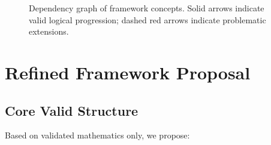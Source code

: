 \begin{figure}[H]
\begin{tikzpicture}
\end{tikzpicture}
\caption{Dependency graph of framework concepts. Solid arrows indicate valid logical progression; dashed red arrows indicate problematic extensions.}
\label{fig:dependency_graph}
\end{figure}

\section{Refined Framework Proposal}

\subsection{Core Valid Structure}

Based on validated mathematics only, we propose:

